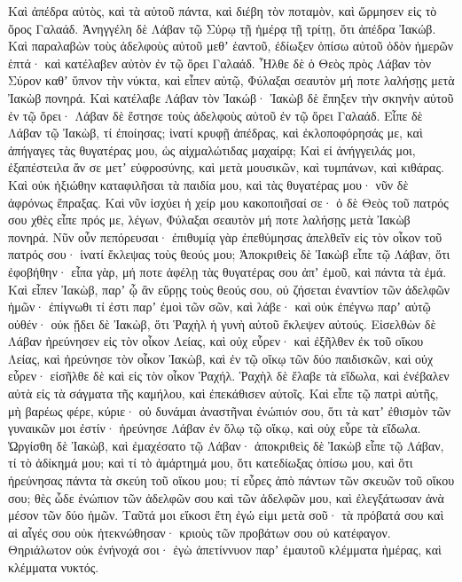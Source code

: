 {Καὶ ἀπέδρα αὐτὸς, καὶ τὰ αὐτοῦ πάντα, καὶ διέβη τὸν ποταμὸν, καὶ ὥρμησεν εἰς τὸ ὄρος Γαλαάδ.
Ἀνηγγέλη δὲ Λάβαν τῷ Σύρῳ τῇ ἡμέρᾳ τῇ τρίτῃ, ὅτι ἀπέδρα Ἰακώβ.
Καὶ παραλαβὼν τοὺς ἀδελφοὺς αὐτοῦ μεθʼ ἑαντοῦ, ἐδίωξεν ὀπίσω αὐτοῦ ὁδὸν ἡμερῶν ἑπτά· καὶ κατέλαβεν αὐτὸν ἐν τῷ ὄρει Γαλαάδ.
Ἦλθε δὲ ὁ Θεὸς πρὸς Λάβαν τὸν Σύρον καθʼ ὕπνον τὴν νύκτα, καὶ εἶπεν αὐτῷ, Φύλαξαι σεαυτὸν μή ποτε λαλήσῃς μετὰ Ἰακὼβ πονηρά.
Καὶ κατέλαβε Λάβαν τὸν Ἰακώβ· Ἰακὼβ δὲ ἔπηξεν τὴν σκηνὴν αὐτοῦ ἐν τῷ ὄρει· Λάβαν δὲ ἔστησε τοὺς ἀδελφοὺς αὐτοῦ ἐν τῷ ὄρει Γαλαάδ.
Εἶπε δὲ Λάβαν τῷ Ἰακὼβ, τί ἐποίησας; ἱνατί κρυφῇ ἀπέδρας, καὶ ἐκλοποφόρησάς με, καὶ ἀπήγαγες τὰς θυγατέρας μου, ὡς αἰχμαλώτιδας μαχαίρᾳ;
Καὶ εἰ ἀνήγγειλάς μοι, ἐξαπέστειλα ἄν σε μετʼ εὐφροσύνης, καὶ μετὰ μουσικῶν, καὶ τυμπάνων, καὶ κιθάρας.
Καὶ οὐκ ἠξιώθην καταφιλῆσαι τὰ παιδία μου, καὶ τὰς θυγατέρας μου· νῦν δὲ ἀφρόνως ἔπραξας.
Καὶ νῦν ἰσχύει ἡ χείρ μου κακοποιῆσαί σε· ὁ δὲ Θεὸς τοῦ πατρός σου χθὲς εἶπε πρός με, λέγων, Φύλαξαι σεαυτὸν μή ποτε λαλήσῃς μετὰ Ἰακὼβ πονηρά.
Νῦν οὖν πεπόρευσαι· ἐπιθυμίᾳ γὰρ ἐπεθύμησας ἀπελθεῖν εἰς τὸν οἶκον τοῦ πατρός σου· ἱνατί ἔκλεψας τοὺς θεούς μου;
Ἀποκριθεὶς δὲ Ἰακὼβ εἶπε τῷ Λάβαν, ὅτι ἐφοβήθην· εἶπα γὰρ, μή ποτε ἀφέλῃ τὰς θυγατέρας σου ἀπʼ ἐμοῦ, καὶ πάντα τὰ ἐμά.
Καὶ εἶπεν Ἰακὼβ, παρʼ ᾧ ἂν εὕρῃς τοὺς θεούς σου, οὐ ζήσεται ἐναντίον τῶν ἀδελφῶν ἡμῶν· ἐπίγνωθι τί ἐστι παρʼ ἐμοὶ τῶν σῶν, καὶ λάβε· καὶ οὐκ ἐπέγνω παρʼ αὐτῷ οὐθέν· οὐκ ᾔδει δὲ Ἰακὼβ, ὅτι Ῥαχὴλ ἡ γυνὴ αὐτοῦ ἔκλεψεν αὐτούς.
Εἰσελθὼν δὲ Λάβαν ἠρεύνησεν εἰς τὸν οἶκον Λείας, καὶ οὐχ εὗρεν· καὶ ἐξῆλθεν ἐκ τοῦ οἴκου Λείας, καὶ ἠρεύνησε τὸν οἶκον Ἰακὼβ, καὶ ἐν τῷ οἴκῳ τῶν δύο παιδισκῶν, καὶ οὐχ εὗρεν· εἰσῆλθε δὲ καὶ εἰς τὸν οἶκον Ῥαχήλ.
Ῥαχὴλ δὲ ἔλαβε τὰ εἴδωλα, καὶ ἐνέβαλεν αὐτὰ εἰς τὰ σάγματα τῆς καμήλου, καὶ ἐπεκάθισεν αὐτοῖς.
Καὶ εἶπε τῷ πατρὶ αὐτῆς, μὴ βαρέως φέρε, κύριε· οὐ δυνάμαι ἀναστῆναι ἐνώπιόν σου, ὅτι τὰ κατʼ ἐθισμὸν τῶν γυναικῶν μοι ἐστίν· ἠρεύνησε Λάβαν ἐν ὅλῳ τῷ οἴκῳ, καὶ οὐχ εὗρε τὰ εἴδωλα.
Ὠργίσθη δὲ Ἰακὼβ, καὶ ἐμαχέσατο τῷ Λάβαν· ἀποκριθεὶς δὲ Ἰακὼβ εἶπε τῷ Λάβαν, τί τὸ ἀδίκημά μου; καὶ τί τὸ ἁμάρτημά μου, ὅτι κατεδίωξας ὀπίσω μου,
καὶ ὅτι ἠρεύνησας πάντα τὰ σκεύη τοῦ οἴκου μου; τί εὗρες ἀπὸ πάντων τῶν σκευῶν τοῦ οἴκου σου; θὲς ὧδε ἐνώπιον τῶν ἀδελφῶν σου καὶ τῶν ἀδελφῶν μου, καὶ ἐλεγξάτωσαν ἀνὰ μέσον τῶν δύο ἡμῶν.
Ταῦτά μοι εἴκοσι ἔτη ἐγώ εἰμι μετὰ σοῦ· τὰ πρόβατά σου καὶ αἱ αἶγές σου οὐκ ἠτεκνώθησαν· κριοὺς τῶν προβάτων σου οὐ κατέφαγον.
Θηριάλωτον οὐκ ἐνήνοχά σοι· ἐγὼ ἀπετίννυον παρʼ ἐμαυτοῦ κλέμματα ἡμέρας, καὶ κλέμματα νυκτός.
}

